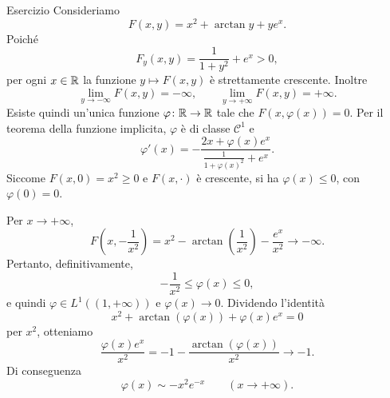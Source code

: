 \documentclass[a4paper]{article}
\begin{document}
\begin{snippetsolution}{Esercizio}
    Consideriamo
    \[
        F(x,y)=x^2+\arctan y+ye^x.
    \]
    Poiché
    \[
        F_y(x,y)=\frac{1}{1+y^2}+e^x>0,
    \]
    per ogni \(x\in\mathbb{R}\) la funzione \(y\mapsto F(x,y)\) è strettamente crescente.
    Inoltre
    \[
        \lim_{y\to-\infty}F(x,y)=-\infty,
        \qquad
        \lim_{y\to+\infty}F(x,y)=+\infty.
    \]
    Esiste quindi un'unica funzione \(\varphi\colon\mathbb{R}\to\mathbb{R}\) tale che
    \(F(x,\varphi(x))=0\). Per il teorema della funzione implicita, \(\varphi\) è di classe
    \(\mathcal C^1\) e
    \[
        \varphi'(x)
        =-\frac{2x+\varphi(x)e^x}
        {\frac{1}{1+\varphi(x)^2}+e^x}.
    \]
    Siccome \(F(x,0)=x^2\geq0\) e \(F(x,\cdot)\) è crescente, si ha
    \(\varphi(x)\leq0\), con \(\varphi(0)=0\).

    Per \(x\to+\infty\),
    \[
        F\left(x,-\frac1{x^2}\right)
        =x^2-\arctan\left(\frac1{x^2}\right)-\frac{e^x}{x^2}
        \longrightarrow-\infty.
    \]
    Pertanto, definitivamente,
    \[
        -\frac1{x^2}\leq\varphi(x)\leq0,
    \]
    e quindi \(\varphi\in L^1((1,+\infty))\) e \(\varphi(x)\to0\).
    Dividendo l'identità
    \[
        x^2+\arctan(\varphi(x))+\varphi(x)e^x=0
    \]
    per \(x^2\), otteniamo
    \[
        \frac{\varphi(x)e^x}{x^2}
        =-1-\frac{\arctan(\varphi(x))}{x^2}\longrightarrow-1.
    \]
    Di conseguenza
    \[
        \varphi(x)\sim-x^2e^{-x}
        \qquad (x\to+\infty).
    \]
\end{snippetsolution}
\end{document}
